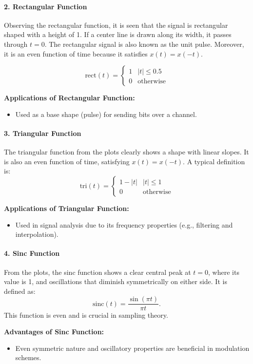 \documentclass[12pt]{article}
\begin{document}
\paragraph{2. Rectangular Function}
Observing the rectangular function, it is seen that the signal is rectangular shaped with a height of 1. If a center line is drawn along its width, it passes through \(t = 0\). The rectangular signal is also known as the unit pulse. Moreover, it is an even function of time because it satisfies \( x(t) = x(-t) \).

\[
\text{rect}(t) = 
\begin{cases}
1 & |t| \le 0.5 \\
0 & \text{otherwise}
\end{cases}
\]

\textbf{Applications of Rectangular Function:}
\begin{itemize}
    \item Used as a base shape (pulse) for sending bits over a channel.
\end{itemize}

\paragraph{3. Triangular Function}
The triangular function from the plots clearly shows a shape with linear slopes. It is also an even function of time, satisfying \(x(t) = x(-t)\). A typical definition is:
\[
\text{tri}(t) = 
\begin{cases}
1 - |t| & |t| \le 1 \\
0 & \text{otherwise}
\end{cases}
\]

\textbf{Applications of Triangular Function:}
\begin{itemize}
    \item Used in signal analysis due to its frequency properties (e.g., filtering and interpolation).
\end{itemize}

\paragraph{4. Sinc Function}
From the plots, the sinc function shows a clear central peak at \(t = 0\), where its value is 1, and oscillations that diminish symmetrically on either side. It is defined as:
\[
\text{sinc}(t) = \frac{\sin(\pi t)}{\pi t}.
\]
This function is even and is crucial in sampling theory.

\textbf{Advantages of Sinc Function:}
\begin{itemize}
    \item Even symmetric nature and oscillatory properties are beneficial in modulation schemes.
\end{itemize}
\end{document}
